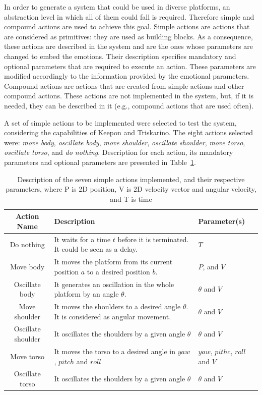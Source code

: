 In order to generate a system that could be used in diverse platforms, an abstraction level in which all of them could fall is required. Therefore simple and compound actions are used to achieve this goal. Simple actions are actions that are considered as primitives: they are used as building blocks. As a consequence, these actions are described in the system and are the ones whose parameters are changed to embed the emotions. Their description specifies mandatory and optional parameters that are required to execute an action. These parameters are modified accordingly to the information provided by the emotional parameters. Compound actions are actions that are created from simple actions and other compound actions. These actions are not implemented in the system, but, if it is needed, they can be described in it (e.g., compound actions that are used often). %

A set of simple actions to be implemented were selected to test the system, considering the capabilities of Keepon and Triskarino. The eight actions selected were: \textit{move body}, \textit{oscillate body}, \textit{move shoulder}, \textit{oscillate shoulder}, \textit{move torso}, \textit{oscillate torso}, and \textit{do nothing}. Description for each action, its mandatory parameters and optional parameters are presented in Table~\ref{table:actions_implemented}.

\begin{table}
\centering
\caption{Description of the seven simple actions implemented, and their respective parameters, where P is 2D position, V is 2D velocity vector and angular velocity, and T is time}
\label{table:actions_implemented}
\begin{tabular}{|c|p{3.9cm}|p{1.4cm}|}
\hline
\textbf{Action Name}& \textbf{Description} &\textbf{Parameter(s)} \\
\hline
Do nothing & It waits for a time $t$ before it is terminated. It could be seen as a delay.  & $T$\\
\hline
Move body & It moves the platform from its current position $a$ to a desired position $b$. & $P$, and $V$\\
\hline
Oscillate body & It generates an oscillation in the whole platform by an angle $\theta$. &  $\theta$ and $V$ \\
\hline
Move shoulder & It moves the shoulders to a desired angle $\theta$. It is considered as angular movement. & $\theta$ and $V$ \\
\hline
Oscillate shoulder & It oscillates the shoulders by a given angle $\theta$ & $\theta$ and $V$\\
\hline
Move torso & It moves the torso to a desired angle in $yaw$, $pitch$ and $roll$& $yaw$, $pithc$, $roll$ and $V$\\
\hline
Oscillate torso & It oscillates the shoulders by a given angle $\theta$ & $\theta$ and $V$\\  
\hline
\end{tabular}
\end{table}

